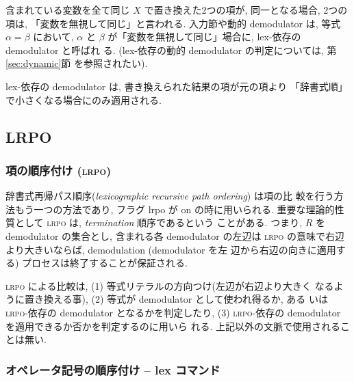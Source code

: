 含まれている変数を全て同じ $X$ で置き換えた2つの項が, 同一となる場合,
2つの項は, 「変数を無視して同じ」と言われる.
入力節や動的 demodulator は, 等式 $\alpha=\beta$ において, $\alpha$ と
$\beta$ が「変数を無視して同じ」場合に, lex-依存の demodulator と呼ばれ
る. (lex-依存の動的 demodulator の判定については, 第\ref{sec:dynamic}節
を参照されたい).

lex-依存の demodulator は, 書き換えられた結果の項が元の項より 「辞書式順」
で小さくなる場合にのみ適用される. 

\subsection{LRPO} \label{sec:lrpo}

\subsubsection{項の順序付け (\textsc{lrpo})}

辞書式再帰パス順序({\em lexicographic recursive path ordering}) は項の比
較を行う方法もう一つの方法であり, フラグ lrpo が on の時に用いられる.
重要な理論的性質として \textsc{lrpo} は, {\em termination} 順序であるという
ことがある.  
つまり, $R$ を demodulator の集合とし, 含まれる各 demodulator の左辺は
\textsc{lrpo} の意味で右辺より大きいならば, demodulation (demodulator を左
辺から右辺の向きに適用する) プロセスは終了することが保証される.

\textsc{lrpo} による比較は, (1) 等式リテラルの方向つけ(左辺が右辺より大きく
なるように置き換える事), (2) 等式が demodulator として使われ得るか, ある
いは \textsc{lrpo}-依存の demodulator となるかを判定したり, 
(3) \textsc{lrpo}-依存の demodulator を適用できるか否かを判定するのに用いら
れる. 上記以外の文脈で使用されることは無い.

\subsubsection{オペレータ記号の順序付け -- lex コマンド}
\label{sec:lex-command}

